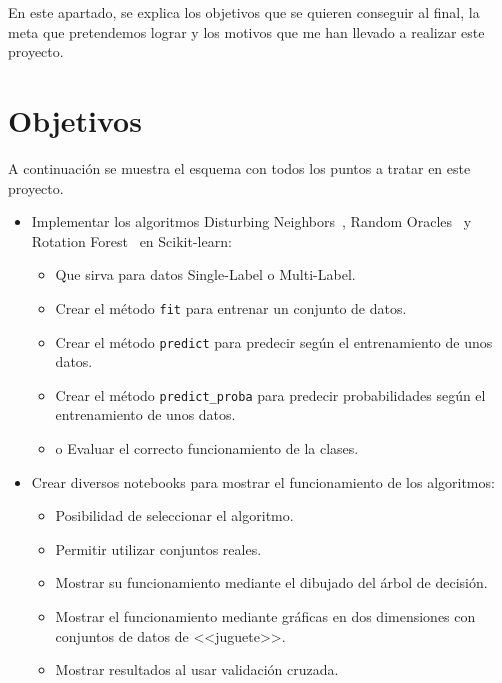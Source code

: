 
En este apartado,  se explica los objetivos que se quieren conseguir al final, la meta que pretendemos lograr y los motivos que me han llevado a realizar este proyecto.

\section{Objetivos}
A continuación se muestra el esquema con todos los puntos a tratar en este proyecto.
\begin{itemize}
\item Implementar los algoritmos Disturbing Neighbors~\cite{disturbingneighbors}, Random Oracles~\cite{randomoracles} y Rotation Forest~\cite{rotationforest} en Scikit-learn:
	\begin{itemize}
		\item Que sirva para datos Single-Label o Multi-Label.
		\item Crear el método \texttt{fit} para entrenar un conjunto de datos.
		\item Crear el método \texttt{predict} para predecir según el entrenamiento de unos datos.
		\item Crear el método \texttt{predict\_proba} para predecir probabilidades según el entrenamiento de unos datos.
		\item o	Evaluar el correcto funcionamiento de la clases.
	\end{itemize}
	
\item Crear diversos notebooks para mostrar el funcionamiento de los algoritmos:
	\begin{itemize}
		\item Posibilidad de seleccionar el algoritmo.
		\item Permitir utilizar conjuntos reales.
		\item Mostrar su funcionamiento mediante el dibujado del árbol de decisión.
		\item Mostrar el funcionamiento mediante gráficas en dos dimensiones con conjuntos de datos de <<juguete>>.
		\item Mostrar resultados al usar validación cruzada.
	\end{itemize}
\end{itemize}
